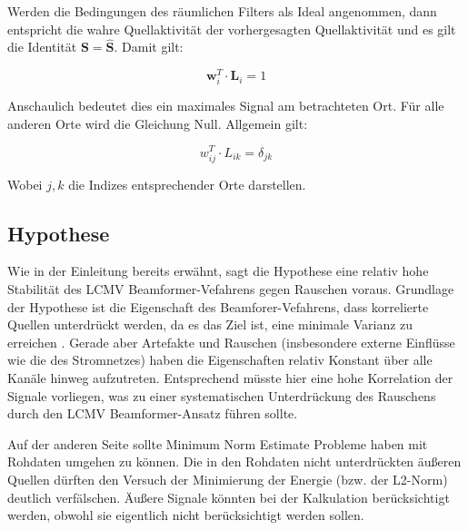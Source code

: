 \documentclass[doc,a4paper,12pt]{apa6}
\newcommand{\mx}[1]{\mathbf{#1}}
\begin{document}
Werden die Bedingungen des räumlichen Filters als Ideal angenommen, dann entspricht die wahre Quellaktivität der vorhergesagten Quellaktivität und es gilt die Identität $\mx{S} = \mx{\hat S}$. Damit gilt:

\begin{equation}
\mx{w}_i^T \cdot \mx{L}_i = 1
\end{equation}

Anschaulich bedeutet dies ein maximales Signal am betrachteten Ort. Für alle anderen Orte wird die Gleichung Null. Allgemein gilt:

\begin{equation}
w^T_{ij} \cdot L_{ik} = \delta_{jk}
\end{equation}

Wobei $j,k$ die Indizes entsprechender Orte darstellen.


\subsection{Hypothese}

Wie in der Einleitung bereits erwähnt, sagt die Hypothese eine relativ hohe Stabilität des LCMV Beamformer-Vefahrens gegen Rauschen voraus. Grundlage der Hypothese ist die Eigenschaft des Beamforer-Vefahrens, dass korrelierte Quellen unterdrückt werden, da es das Ziel ist, eine minimale Varianz zu erreichen \parencite{van1997localization}. Gerade aber Artefakte und Rauschen (insbesondere externe Einflüsse wie die des Stromnetzes) haben die Eigenschaften relativ Konstant über alle Kanäle hinweg aufzutreten. Entsprechend müsste hier eine hohe Korrelation der Signale vorliegen, was zu einer systematischen Unterdrückung des Rauschens durch den LCMV Beamformer-Ansatz führen sollte.

Auf der anderen Seite sollte Minimum Norm Estimate Probleme haben mit Rohdaten umgehen zu können. Die in den Rohdaten nicht unterdrückten äußeren Quellen dürften den Versuch der Minimierung der Energie (bzw. der L2-Norm) deutlich verfälschen. Äußere Signale könnten bei der Kalkulation berücksichtigt werden, obwohl sie eigentlich nicht berücksichtigt werden sollen.
\end{document}

